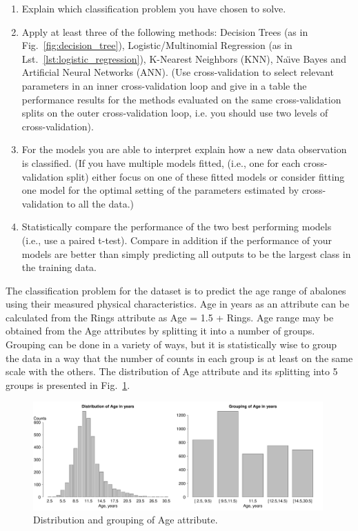 \documentclass[10pt, paper=a4]{article}
\begin{document}
\begin{enumerate}
\item Explain which classification problem you have chosen to solve.
\item Apply at least three of the following methods: Decision Trees
  (as in Fig.~\ref{fig:decision_tree}), Logistic/Multinomial
  Regression (as in Lst.~\ref{lst:logistic_regression}), K-Nearest
  Neighbors (KNN), Naı̈ve Bayes and Artificial Neural Networks (ANN).
  (Use cross-validation to select relevant parameters in an inner
  cross-validation loop and give in a table the performance results
  for the methods evaluated on the same cross-validation splits on the
  outer cross-validation loop, i.e. you should use two levels of
  cross-validation).
\item For the models you are able to interpret explain how a new data
  observation is classified.  (If you have multiple models fitted,
  (i.e., one for each cross-validation split) either focus on one of
  these fitted models or consider fitting one model for the optimal
  setting of the parameters estimated by cross-validation to all the
  data.)
\item Statistically compare the performance of the two best performing
  models (i.e., use a paired t-test). Compare in addition if the
  performance of your models are better than simply predicting all
  outputs to be the largest class in the training data.
\end{enumerate}


The classification problem for the dataset is to predict the age range
of abalones using their measured physical characteristics.  Age in
years as an attribute can be calculated from the Rings attribute as
Age = 1.5 + Rings.  Age range may be obtained from the Age attributes
by splitting it into a number of groups.  Grouping can be done in a
variety of ways, but it is statistically wise to group the data in a
way that the number of counts in each group is at least on the same
scale with the others.  The distribution of Age attribute and its
splitting into 5 groups is presented in Fig.~\ref{fig:age_grouping}.

\begin{figure}[htbp]
  \centering
  \includegraphics[width = 0.99\textwidth]{age_grouping.pdf}
  \caption{Distribution and grouping of Age attribute.}
  \label{fig:age_grouping}
\end{figure}
\end{document}
